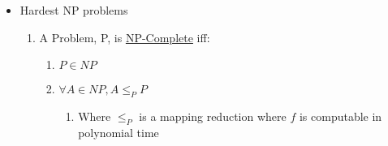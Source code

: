 \documentclass[11pt]{article}
\begin{document}
\begin{itemize}
\item Hardest NP problems\\
\label{sec-7.2.1.4}

\begin{enumerate}
\item A Problem, P, is \underline{NP-Complete} iff:

\begin{enumerate}
\item $P\in NP$
\item $\forall A \in NP, A \leq_P P$

\begin{enumerate}
\item Where $\leq_P$ is a mapping reduction where $f$ is
              computable in polynomial time
\end{enumerate}

\end{enumerate}

\end{enumerate}
\end{itemize} %
\end{document}
